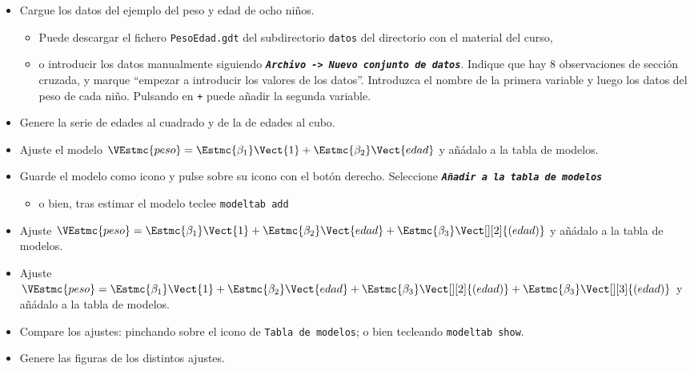 \documentclass[11pt]{article}
\begin{document}
\begin{itemize}
\item Cargue los datos del ejemplo del peso y edad de ocho niños.

\begin{itemize}
\item Puede descargar el fichero \texttt{PesoEdad.gdt} del subdirectorio
\texttt{datos} del directorio con el material del curso,

\item o introducir los datos manualmente siguiendo \textbf{\emph{\texttt{Archivo ->
       Nuevo conjunto de datos}}}. Indique que hay 8 observaciones de
sección cruzada, y marque ``empezar a introducir los valores de
los datos''. Introduzca el nombre de la primera variable y
luego los datos del peso de cada niño. Pulsando en \texttt{+} puede
añadir la segunda variable.
\end{itemize}

\item Genere la serie de edades al cuadrado y de la de edades al cubo.

\item Ajuste el modelo
\(\VEstmc{peso}=\Estmc{\beta_1}\Vect{1}+\Estmc{\beta_2}\Vect{edad}\)
y añádalo a la tabla de modelos.
\end{itemize}


\begin{itemize}
\item Guarde el modelo como icono y pulse sobre su icono con el
botón derecho. Seleccione \textbf{\emph{\texttt{Añadir a la tabla de modelos}}}

\begin{itemize}
\item o bien, tras estimar el modelo teclee \texttt{modeltab add}
\end{itemize}
\end{itemize}
\begin{itemize}
\item Ajuste
\(\VEstmc{peso}=\Estmc{\beta_1}\Vect{1}+\Estmc{\beta_2}\Vect{edad}+\Estmc{\beta_3}\Vect[][2]{(edad)}\)
y añádalo a la tabla de modelos.

\item Ajuste
\(\VEstmc{peso}=\Estmc{\beta_1}\Vect{1}+\Estmc{\beta_2}\Vect{edad}+\Estmc{\beta_3}\Vect[][2]{(edad)}+\Estmc{\beta_3}\Vect[][3]{(edad)}\)
y añádalo a la tabla de modelos.

\item Compare los ajustes: pinchando sobre el icono de \texttt{Tabla de
     modelos}; o bien tecleando \texttt{modeltab show}.

\item Genere las figuras de los distintos ajustes.
\end{itemize}
\end{document}
